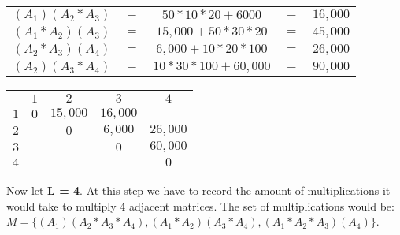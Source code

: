 \documentclass{article}
\begin{document}
\begin{center}
	\begin{tabular}{|c c c c c |}
		
		\hline
		$(A_{1})(A_{2} * A_{3})$ &$=$ &$50 * 10 * 20 + 6000$ &$=$ &$16,000$\\
		$(A_{1} *A_{2})(A_{3})$ &$=$ &$15,000 + 50 * 30 * 20$ &$=$ &$45,000$ \\
		\hline
		$(A_{2} * A_{3})(A_{4})$ &$=$ &$6,000 + 10 * 20 * 100$ &$=$ &$26,000$ \\
		$(A_{2})(A_{3} * A_{4})$ &$=$ &$10 * 30 * 100 + 60,000$ &$=$ &$90,000$ \\
		\hline
	
	\end{tabular}
\end{center}
\begin{center}

	\begin{tabular}{c | c | c | c | c}
	
		&$1$ &$2$ &$3$ &$4$ \\
		\hline
		$1$ &$0$ &$15,000$ &$16,000$ &\\
		\hline
		$2$ & &$0$ &$6,000$ &$26,000$\\
		\hline
		$3$ & & &$0$ &$60,000$\\
		\hline
		$4$ & & & &$0$\\
		
	\end{tabular}
\end{center}

Now let \textbf{L = 4}. At this step we have to record the amount of multiplications it would take to multiply 4 adjacent matrices. The set of multiplications would be: $M = \{(A_{1})(A_{2} * A_{3}*A_{4}), (A_{1} *A_{2})(A_{3}*A_{4}), (A_{1} * A_{2} * A_{3})(A_{4})\}$. 
\end{document}

